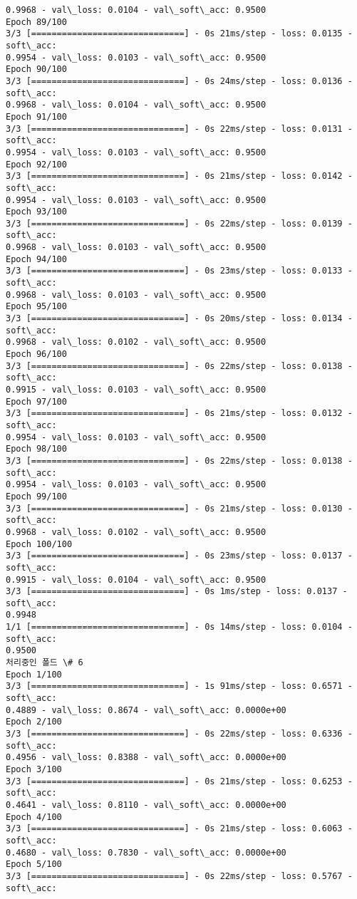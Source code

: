 \documentclass[11pt]{article}
\begin{document}
\begin{Verbatim}[commandchars=\\\{\}]
0.9968 - val\_loss: 0.0104 - val\_soft\_acc: 0.9500
Epoch 89/100
3/3 [==============================] - 0s 21ms/step - loss: 0.0135 - soft\_acc:
0.9954 - val\_loss: 0.0103 - val\_soft\_acc: 0.9500
Epoch 90/100
3/3 [==============================] - 0s 24ms/step - loss: 0.0136 - soft\_acc:
0.9968 - val\_loss: 0.0104 - val\_soft\_acc: 0.9500
Epoch 91/100
3/3 [==============================] - 0s 22ms/step - loss: 0.0131 - soft\_acc:
0.9954 - val\_loss: 0.0103 - val\_soft\_acc: 0.9500
Epoch 92/100
3/3 [==============================] - 0s 21ms/step - loss: 0.0142 - soft\_acc:
0.9954 - val\_loss: 0.0103 - val\_soft\_acc: 0.9500
Epoch 93/100
3/3 [==============================] - 0s 22ms/step - loss: 0.0139 - soft\_acc:
0.9968 - val\_loss: 0.0103 - val\_soft\_acc: 0.9500
Epoch 94/100
3/3 [==============================] - 0s 23ms/step - loss: 0.0133 - soft\_acc:
0.9968 - val\_loss: 0.0103 - val\_soft\_acc: 0.9500
Epoch 95/100
3/3 [==============================] - 0s 20ms/step - loss: 0.0134 - soft\_acc:
0.9968 - val\_loss: 0.0102 - val\_soft\_acc: 0.9500
Epoch 96/100
3/3 [==============================] - 0s 22ms/step - loss: 0.0138 - soft\_acc:
0.9915 - val\_loss: 0.0103 - val\_soft\_acc: 0.9500
Epoch 97/100
3/3 [==============================] - 0s 21ms/step - loss: 0.0132 - soft\_acc:
0.9954 - val\_loss: 0.0103 - val\_soft\_acc: 0.9500
Epoch 98/100
3/3 [==============================] - 0s 22ms/step - loss: 0.0138 - soft\_acc:
0.9954 - val\_loss: 0.0103 - val\_soft\_acc: 0.9500
Epoch 99/100
3/3 [==============================] - 0s 21ms/step - loss: 0.0130 - soft\_acc:
0.9968 - val\_loss: 0.0102 - val\_soft\_acc: 0.9500
Epoch 100/100
3/3 [==============================] - 0s 23ms/step - loss: 0.0137 - soft\_acc:
0.9915 - val\_loss: 0.0104 - val\_soft\_acc: 0.9500
3/3 [==============================] - 0s 1ms/step - loss: 0.0137 - soft\_acc:
0.9948
1/1 [==============================] - 0s 14ms/step - loss: 0.0104 - soft\_acc:
0.9500
처리중인 폴드 \# 6
Epoch 1/100
3/3 [==============================] - 1s 91ms/step - loss: 0.6571 - soft\_acc:
0.4889 - val\_loss: 0.8674 - val\_soft\_acc: 0.0000e+00
Epoch 2/100
3/3 [==============================] - 0s 22ms/step - loss: 0.6336 - soft\_acc:
0.4956 - val\_loss: 0.8388 - val\_soft\_acc: 0.0000e+00
Epoch 3/100
3/3 [==============================] - 0s 21ms/step - loss: 0.6253 - soft\_acc:
0.4641 - val\_loss: 0.8110 - val\_soft\_acc: 0.0000e+00
Epoch 4/100
3/3 [==============================] - 0s 21ms/step - loss: 0.6063 - soft\_acc:
0.4680 - val\_loss: 0.7830 - val\_soft\_acc: 0.0000e+00
Epoch 5/100
3/3 [==============================] - 0s 22ms/step - loss: 0.5767 - soft\_acc:

\end{Verbatim}
\end{document}
